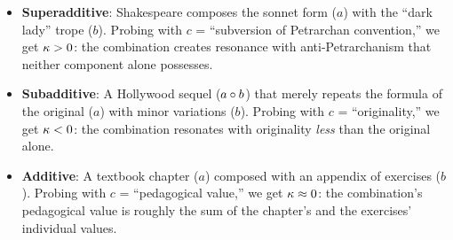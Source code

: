 \begin{example}
\begin{itemize}
    \item \textbf{Superadditive}: Shakespeare composes the sonnet form ($a$)
    with the ``dark lady'' trope ($b$). Probing with $c$ = ``subversion of
    Petrarchan convention,'' we get $\kappa > 0$: the combination creates
    resonance with anti-Petrarchanism that neither component alone
    possesses.

    \item \textbf{Subadditive}: A Hollywood sequel ($a \circ b$) that
    merely repeats the formula of the original ($a$) with minor variations
    ($b$). Probing with $c$ = ``originality,'' we get $\kappa < 0$: the
    combination resonates with originality \emph{less} than the original
    alone.

    \item \textbf{Additive}: A textbook chapter ($a$) composed with an
    appendix of exercises ($b$). Probing with $c$ = ``pedagogical value,''
    we get $\kappa \approx 0$: the combination's pedagogical value is
    roughly the sum of the chapter's and the exercises' individual values.
\end{itemize}
\end{example}

